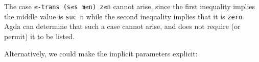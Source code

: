 The case \texttt{≤-trans\ (s≤s\ m≤n)\ z≤n} cannot arise, since the first
inequality implies the middle value is \texttt{suc\ n} while the second
inequality implies that it is \texttt{zero}. Agda can determine that
such a case cannot arise, and does not require (or permit) it to be
listed.

Alternatively, we could make the implicit parameters explicit:

\begin{fence}
\begin{code}%
\>[0]\AgdaSpace{}%
\AgdaSymbol{:}\AgdaSpace{}%
\AgdaSpace{}%
\AgdaSymbol{(}\AgdaSpace{}%
\AgdaSpace{}%
\AgdaSpace{}%
\AgdaSymbol{:}\AgdaSpace{}%
\AgdaSymbol{)}\<%
\\
\>[0][@{}l@{\AgdaIndent{0}}]%
\>[2]\AgdaSpace{}%
\AgdaSpace{}%
\AgdaSpace{}%
\<%
\\
%
\>[2]%
\>[208I]\AgdaSpace{}%
\AgdaSpace{}%
\<%
\\
\>[.][@{}l@{}]\<[208I]%
\>[4]\AgdaComment{-----}\<%
\\
%
\>[2]\AgdaSpace{}%
\AgdaSpace{}%
\AgdaSpace{}%
\<%
\\
\>[0]\AgdaSpace{}%
%
\>[17]\AgdaSymbol{\AgdaUnderscore{}}%
\>[25]\AgdaSymbol{\AgdaUnderscore{}}%
\>[33]%
\>[43]\AgdaSymbol{\AgdaUnderscore{}}%
\>[54]\AgdaSymbol{=}%
\>[57]\<%
\\
\>[0]\AgdaSpace{}%
\AgdaSymbol{(}\AgdaSpace{}%
\AgdaSymbol{)}\AgdaSpace{}%
\AgdaSymbol{(}\AgdaSpace{}%
\AgdaSymbol{)}\AgdaSpace{}%
\AgdaSymbol{(}\AgdaSpace{}%
\AgdaSymbol{)}\AgdaSpace{}%
\AgdaSymbol{(}\AgdaSpace{}%
\AgdaSymbol{)}\AgdaSpace{}%
\AgdaSymbol{(}\AgdaSpace{}%
\AgdaSymbol{)}%
\>[54]\AgdaSymbol{=}%
\>[57]\AgdaSpace{}%
\AgdaSymbol{(}\AgdaSpace{}%
\AgdaSpace{}%
\AgdaSpace{}%
\AgdaSpace{}%
\AgdaSpace{}%
\AgdaSymbol{)}\<%
\end{code}
\end{fence}

